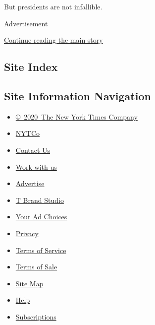 But presidents are not infallible.

Advertisement

\protect\hyperlink{after-bottom}{Continue reading the main story}

\hypertarget{site-index}{%
\subsection{Site Index}\label{site-index}}

\hypertarget{site-information-navigation}{%
\subsection{Site Information
Navigation}\label{site-information-navigation}}

\begin{itemize}
\tightlist
\item
  \href{https://help.nytimes.com/hc/en-us/articles/115014792127-Copyright-notice}{©~2020~The
  New York Times Company}
\end{itemize}

\begin{itemize}
\tightlist
\item
  \href{https://www.nytco.com/}{NYTCo}
\item
  \href{https://help.nytimes.com/hc/en-us/articles/115015385887-Contact-Us}{Contact
  Us}
\item
  \href{https://www.nytco.com/careers/}{Work with us}
\item
  \href{https://nytmediakit.com/}{Advertise}
\item
  \href{http://www.tbrandstudio.com/}{T Brand Studio}
\item
  \href{https://www.nytimes.com/privacy/cookie-policy\#how-do-i-manage-trackers}{Your
  Ad Choices}
\item
  \href{https://www.nytimes.com/privacy}{Privacy}
\item
  \href{https://help.nytimes.com/hc/en-us/articles/115014893428-Terms-of-service}{Terms
  of Service}
\item
  \href{https://help.nytimes.com/hc/en-us/articles/115014893968-Terms-of-sale}{Terms
  of Sale}
\item
  \href{https://spiderbites.nytimes.com}{Site Map}
\item
  \href{https://help.nytimes.com/hc/en-us}{Help}
\item
  \href{https://www.nytimes.com/subscription?campaignId=37WXW}{Subscriptions}
\end{itemize}
